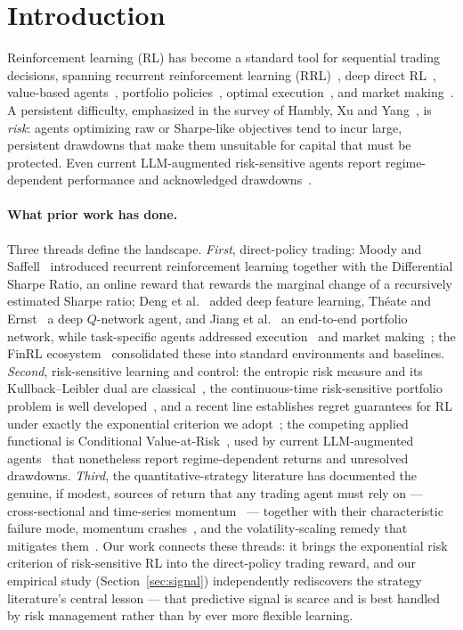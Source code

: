 \documentclass[11pt]{article}
\theoremstyle{definition}
\begin{document}
\section{Introduction}\label{sec:intro}

Reinforcement learning (RL) has become a standard tool for sequential trading
decisions, spanning recurrent reinforcement learning (RRL)~\cite{moody2001}, deep
direct RL~\cite{deng2017}, value-based agents~\cite{theate2021}, portfolio
policies~\cite{jiang2017}, optimal execution~\cite{nevmyvaka2006}, and market
making~\cite{spooner2018}. A persistent difficulty, emphasized in the survey of
Hambly, Xu and Yang~\cite{hambly2023}, is \emph{risk}: agents optimizing raw or
Sharpe-like objectives tend to incur large, persistent drawdowns that make them
unsuitable for capital that must be protected. Even current LLM-augmented
risk-sensitive agents report regime-dependent performance and acknowledged
drawdowns~\cite{benhenda2025,dapo2025}.

\paragraph{What prior work has done.} Three threads define the landscape.
\emph{First}, direct-policy trading: Moody and Saffell~\cite{moody2001} introduced
recurrent reinforcement learning together with the Differential Sharpe Ratio, an
online reward that rewards the marginal change of a recursively estimated Sharpe
ratio; Deng et al.~\cite{deng2017} added deep feature learning, Th\'eate and
Ernst~\cite{theate2021} a deep $Q$-network agent, and Jiang et al.~\cite{jiang2017}
an end-to-end portfolio network, while task-specific agents addressed
execution~\cite{nevmyvaka2006} and market making~\cite{spooner2018}; the FinRL
ecosystem~\cite{finrl2020} consolidated these into standard environments and
baselines. \emph{Second}, risk-sensitive learning and control: the entropic risk
measure and its Kullback--Leibler dual are classical~\cite{follmer2002}, the
continuous-time risk-sensitive portfolio problem is well
developed~\cite{bielecki1999,flemingmce1995}, and a recent line establishes regret
guarantees for RL under exactly the exponential criterion we
adopt~\cite{fei2020,fei2021,noorani2022,borkar2002}; the competing applied functional
is Conditional Value-at-Risk~\cite{rockafellar2000}, used by current LLM-augmented
agents~\cite{benhenda2025,dapo2025} that nonetheless report regime-dependent returns
and unresolved drawdowns. \emph{Third}, the quantitative-strategy literature has
documented the genuine, if modest, sources of return that any trading agent must rely
on --- cross-sectional and time-series momentum~\cite{jegadeesh1993,moskowitz2012}
--- together with their characteristic failure mode, momentum
crashes~\cite{daniel2016}, and the volatility-scaling remedy that mitigates
them~\cite{moreira2017,lim2019}. Our work connects these threads: it brings the
exponential risk criterion of risk-sensitive RL into the direct-policy trading
reward, and our empirical study (Section~\ref{sec:signal}) independently rediscovers
the strategy literature's central lesson --- that predictive signal is scarce and is
best handled by risk management rather than by ever more flexible learning.
\end{document}

